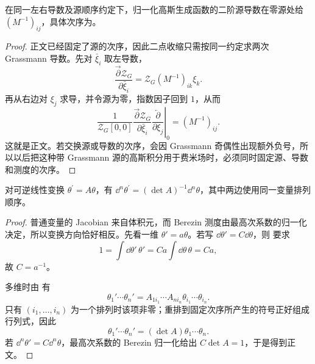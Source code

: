\begin{corollary}
在同一左右导数及源顺序约定下，归一化高斯生成函数的二阶源导数在零源处给 $(M^{-1})_{ij}$，具体次序为。
\end{corollary}
\begin{proof}
正文已经固定了源的次序，因此二点收缩只需按同一约定求两次 Grassmann 导数。先对 $\bar\xi_i$ 取左导数，
\begin{equation*}
 \frac{\overrightarrow\partial\mathcal Z_G}{\partial\bar\xi_i}
 =\mathcal Z_G(M^{-1})_{ik}\xi_k.
\end{equation*}
再从右边对 $\xi_j$ 求导，并令源为零，指数因子回到 $1$，从而
\begin{equation*}
 \left.
 \frac{1}{\mathcal Z_G[0,0]}
 \frac{\overrightarrow\partial\mathcal Z_G}{\partial\bar\xi_i}
 \frac{\overleftarrow\partial}{\partial\xi_j}
 \right|_{0}
 =(M^{-1})_{ij}.
\end{equation*}
这就是正文。若交换源或导数的次序，会因 Grassmann 奇偶性出现额外负号，所以以后把这种带 Grassmann 源的高斯积分用于费米场时，必须同时固定源、导数和测度的次序。
\end{proof}

\begin{lemma}
对可逆线性变换 $\theta^\prime=A\theta$，有 $\dd^n\theta^\prime=(\det A)^{-1}\dd^n\theta$，其中两边使用同一变量排列顺序。
\end{lemma}
\begin{proof}
普通变量的 Jacobian 来自体积元，而 Berezin 测度由最高次系数的归一化决定，所以变换方向恰好相反。先看一维 $\theta'=a\theta$。若写 $\dd\theta'=C\dd\theta$，则 要求
\begin{equation*}
 1=\int\dd\theta'\,\theta'
 =Ca\int\dd\theta\,\theta=Ca,
\end{equation*}
故 $C=a^{-1}$。

多维时由 有
\begin{equation*}
 \theta_1'\cdots\theta_n'
 =A_{1i_1}\cdots A_{ni_n}\theta_{i_1}\cdots\theta_{i_n}.
\end{equation*}
只有 $(i_1,\ldots,i_n)$ 为一个排列时该项非零；重排到固定次序所产生的符号正好组成行列式，因此
\begin{equation*}
 \theta_1'\cdots\theta_n'=(\det A)\theta_1\cdots\theta_n.
\end{equation*}
若 $\dd^n\theta'=C\dd^n\theta$，最高次系数的 Berezin 归一化给出 $C\det A=1$，于是得到正文。
\end{proof}

